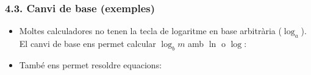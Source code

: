 \documentclass[aspectratio=169]{beamer}
\begin{document}
\begin{frame}[t]
  \frametitle{4.3. Canvi de base (exemples)}

  \small
  \begin{itemize}
    \item<1-> Moltes calculadores no tenen la tecla de logaritme en base arbitrària (\(\log_a\)). El canvi de base ens permet calcular \(\log_b m\) amb \(\ln\) o \(\log\):
    \item<2-> També ens permet resoldre equacions:
  \end{itemize}
\end{frame}
\end{document}
